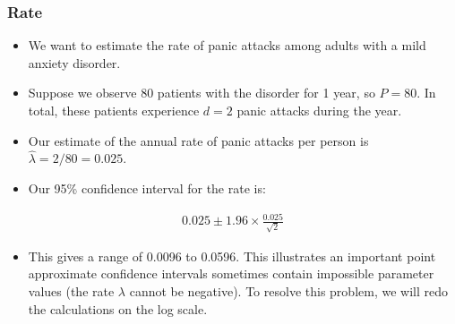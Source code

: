 \documentclass[letterpaper,10pt,english]{jupyterBook}
\begin{document}
\subsubsection*{Rate}
\begin{itemize}
\item {} 
\sphinxAtStartPar
We want to estimate the rate of panic attacks among adults with a mild anxiety disorder.

\item {} 
\sphinxAtStartPar
Suppose we observe \(80\) patients with the disorder for 1 year, so \(P=80\). In total, these patients experience \(d=2\) panic attacks during the year.

\item {} 
\sphinxAtStartPar
Our estimate of the annual rate of panic attacks per person is \(\hat{\lambda} = 2/80 = 0.025\).

\item {} 
\sphinxAtStartPar
Our 95\% confidence interval for the rate is:

\end{itemize}
\begin{equation*}
\begin{split}
0.025 \pm 1.96 \times \frac{0.025}{\sqrt{2}}
\end{split}
\end{equation*}\begin{itemize}
\item {} 
\sphinxAtStartPar
This gives a range of \sphinxhyphen{}0.0096 to 0.0596. This illustrates an important point \sphinxhyphen{} approximate confidence intervals sometimes contain impossible parameter values (the rate \(\lambda\) cannot be negative). To resolve this problem, we will re\sphinxhyphen{}do the calculations on the log scale.

\end{itemize}
\end{document}
